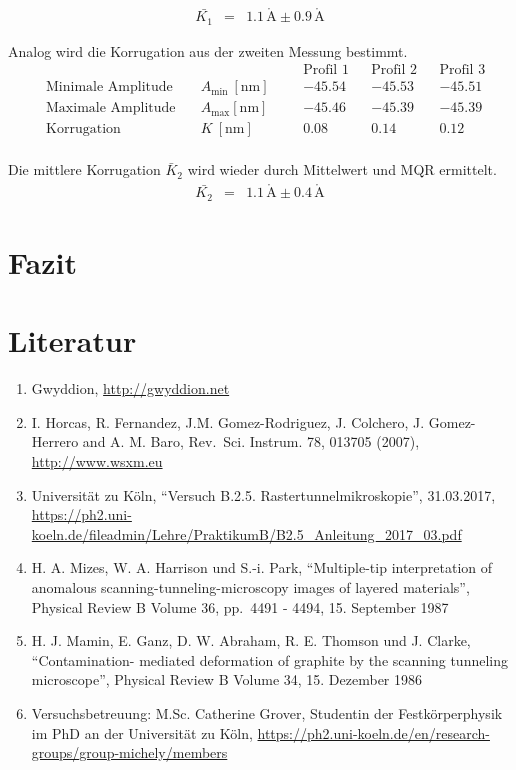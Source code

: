 \documentclass[12pt,a4paper]{scrartcl}
\numberwithin{equation}{section} %
\begin{document}
\begin{eqnarray}
    \bar{K_1} &=& 1.1 \mathrm{\,\mathring{A}} \pm 0.9 \mathrm{\,\mathring{A}}
\end{eqnarray}

Analog wird die Korrugation aus der zweiten Messung bestimmt.
\begin{align*}
    &&&&& \text{Profil 1}&& \text{Profil 2} && \text{Profil 3} \\
    &\text{Minimale Amplitude}\quad &A_\mathrm{min}\ [\mathrm{nm}] &&
        & -45.54 && -45.53 && -45.51 \\
    &\text{Maximale Amplitude}\quad &A_\mathrm{max} [\mathrm{nm}] &&
        & -45.46 && -45.39 && -45.39 \\
    &\text{Korrugation} &K\ [\mathrm{nm}] &&
        & 0.08 && 0.14 && 0.12 \\
\end{align*}

Die mittlere Korrugation $\bar K_2$ wird wieder durch Mittelwert und
MQR ermittelt.
\begin{eqnarray}
    \bar{K_2} &=& 1.1 \mathrm{\,\mathring{A}} \pm 0.4 \mathrm{\,\mathring{A}}
\end{eqnarray}

\hypertarget{fazit}{%
\section{Fazit}\label{fazit}}

\hypertarget{literatur}{%
\section{Literatur}\label{literatur}}

\begin{enumerate}
\def\labelenumi{\arabic{enumi}.}
\item
  Gwyddion, \url{http://gwyddion.net}
\item
  I. Horcas, R. Fernandez, J.M. Gomez-Rodriguez, J. Colchero, J.
  Gomez-Herrero and A. M. Baro, Rev.~Sci. Instrum. 78, 013705 (2007),
  \url{http://www.wsxm.eu}
\item
  Universität zu Köln, ``Versuch B.2.5. Rastertunnelmikroskopie'',
  31.03.2017,
  \url{https://ph2.uni-koeln.de/fileadmin/Lehre/PraktikumB/B2.5_Anleitung_2017_03.pdf}
\item
  H. A. Mizes, W. A. Harrison und S.-i. Park, ``Multiple-tip
  interpretation of anomalous scanning-tunneling-microscopy images of
  layered materials'', Physical Review B Volume 36, pp.~4491 - 4494, 15.
  September 1987
\item
  H. J. Mamin, E. Ganz, D. W. Abraham, R. E. Thomson und J. Clarke,
  ``Contamination- mediated deformation of graphite by the scanning
  tunneling microscope'', Physical Review B Volume 34, 15. Dezember 1986
\item
  Versuchsbetreuung: M.Sc. Catherine Grover, Studentin der
  Festkörperphysik im PhD an der Universität zu Köln,
  \url{https://ph2.uni-koeln.de/en/research-groups/group-michely/members}
\end{enumerate}
\end{document}
